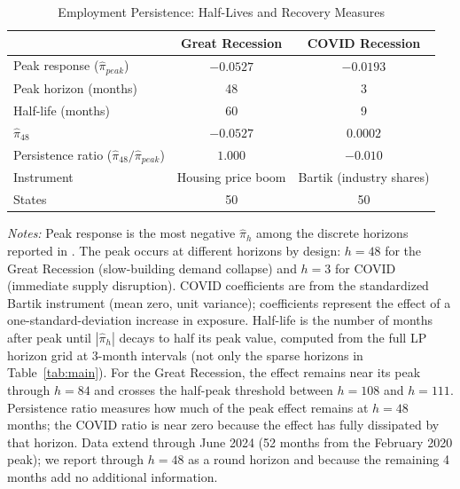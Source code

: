 \documentclass[12pt]{article}
\begin{document}
\begin{table}[H]
\centering
\caption{Employment Persistence: Half-Lives and Recovery Measures}
\begin{threeparttable}
\begin{tabular}{lcc}
\toprule
& Great Recession & COVID Recession \\
\midrule
Peak response ($\hat{\pi}_{peak}$) & $-0.0527$ & $-0.0193$ \\
Peak horizon (months) & 48 & 3 \\
Half-life (months) & 60 & 9 \\
$\hat{\pi}_{48}$ & $-0.0527$ & $0.0002$ \\
Persistence ratio ($\hat{\pi}_{48} / \hat{\pi}_{peak}$) & $1.000$ & $-0.010$ \\
\midrule
Instrument & Housing price boom & Bartik (industry shares) \\
States & 50 & 50 \\
\bottomrule
\end{tabular}
\begin{tablenotes}[flushleft]
\small
\item \textit{Notes:} Peak response is the most negative $\hat{\pi}_h$ among the discrete horizons reported in . The peak occurs at different horizons by design: $h=48$ for the Great Recession (slow-building demand collapse) and $h=3$ for COVID (immediate supply disruption). COVID coefficients are from the standardized Bartik instrument (mean zero, unit variance); coefficients represent the effect of a one-standard-deviation increase in exposure. Half-life is the number of months after peak until $|\hat{\pi}_h|$ decays to half its peak value, computed from the full LP horizon grid at 3-month intervals (not only the sparse horizons in Table~\ref{tab:main}). For the Great Recession, the effect remains near its peak through $h = 84$ and crosses the half-peak threshold between $h = 108$ and $h = 111$. Persistence ratio measures how much of the peak effect remains at $h=48$ months; the COVID ratio is near zero because the effect has fully dissipated by that horizon. Data extend through June 2024 (52 months from the February 2020 peak); we report through $h=48$ as a round horizon and because the remaining 4 months add no additional information.
\end{tablenotes}
\end{threeparttable}
\label{tab:halflife}
\end{table}
\end{document}
